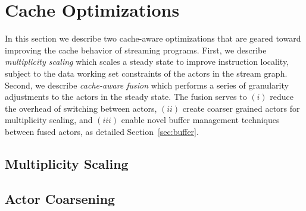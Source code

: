 \section{Cache Optimizations}
\label{sec:cache-opt}

In this section we describe two cache-aware optimizations that
are geared toward improving the cache behavior of streaming programs. First, we
describe {\it multiplicity scaling} which 
scales a steady state to improve instruction locality, subject to the
data working set constraints of the actors in the stream graph.
Second, we describe {\it cache-aware fusion} which performs a series
of granularity adjustments to the actors in the steady state. The
fusion serves to $(i)$ reduce
the overhead of switching between actors, $(ii)$ create coarser
grained actors for multiplicity scaling, and $(iii)$ enable novel
buffer management techniques between fused actors, as detailed
Section~\ref{sec:buffer}.

\subsection{Multiplicity Scaling}


\subsection{Actor Coarsening}
